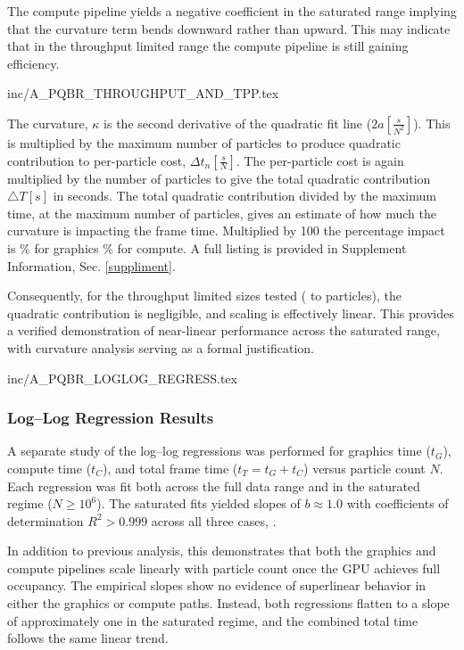 The compute pipeline yields a negative coefficient in the saturated range implying that the curvature term bends downward rather than upward. This may indicate that in the throughput limited range the 
compute pipeline is still gaining efficiency. 

 {inc/A_PQBR_THROUGHPUT_AND_TPP.tex}

The curvature, $\kappa$ is the second derivative of the quadratic fit line ($2a \left[ \frac{s}{N^2} \right]$). This is multiplied by the maximum number of particles to produce quadratic contribution to per-particle cost, $\Delta t_n \left[ \frac{s}{N} \right]$. The per-particle cost is again multiplied by the number of particles to give the total quadratic contribution $\triangle T \left[s \right]$ in seconds. The total quadratic contribution divided by the maximum time, at the maximum number of particles, gives an estimate of how much the curvature is impacting the frame time. Multiplied by 100 the percentage impact is \APBQRCURVATUREgmsQuadraticContributionpct{}\% for graphics \APBQRCURVATUREcmsQuadraticContributionpct{}\% for compute. A full listing is provided in Supplement Information, Sec. \ref{suppliment}.        



Consequently, for the throughput limited sizes tested (\numprint{\APBQRCURVATUREStartRowParticlesVal{}} to \numprint{\APBQRCURVATUREtotMaxParticles{}} particles), the quadratic contribution is negligible, and scaling is effectively linear. This provides a verified demonstration of near-linear performance across the saturated range, with curvature analysis serving as a formal justification.

 {inc/A_PQBR_LOGLOG_REGRESS.tex}

\subsubsection{Log--Log Regression Results}

A separate study of the log--log regressions was performed for graphics time ($t_G$), compute time ($t_C$), and total frame time ($t_T = t_G + t_C$) versus particle count $N$. Each regression was fit both across the full data range and in the saturated regime ($N \geq 10^{6}$). The saturated fits yielded slopes of $b \approx 1.0$ with coefficients of determination $R^{2} > 0.999$ across all three cases, . 

In addition to previous analysis, this demonstrates that both the graphics and compute pipelines scale linearly with particle count once the GPU achieves full occupancy. The empirical slopes show no evidence of superlinear behavior in either the graphics or compute paths. Instead, both regressions flatten to a slope of approximately one in the saturated regime, and the combined total time follows the same linear trend. 


